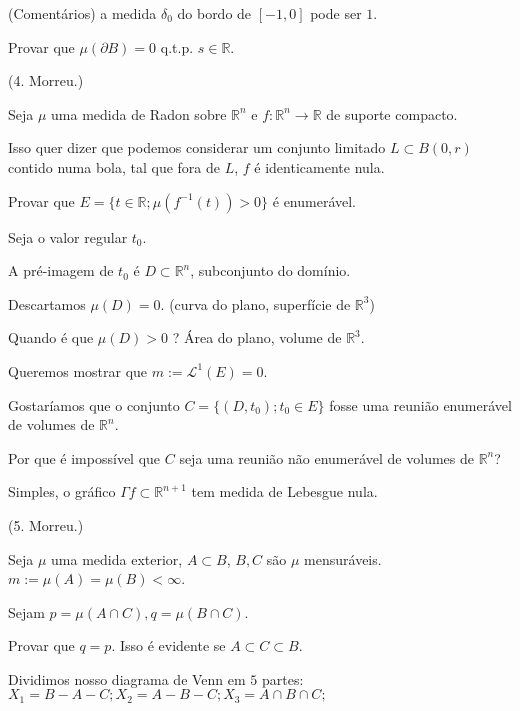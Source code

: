 \documentclass[12pt]{article}
\begin{document}
\vspace{3mm}

(Coment\'arios) a medida $\delta_0$ do bordo de $[-1, 0]$ pode ser $1$.

Provar que $\mu (\partial B) = 0$ q.t.p. $s \in \mathbb{R}$.

\vspace{3mm}

(4. Morreu.)

Seja $\mu$ uma medida de Radon sobre $\mathbb{R}^n$ e $f : \mathbb{R}^n \to \mathbb{R}$ de suporte compacto.

Isso quer dizer que podemos considerar um conjunto limitado $L \subset B(0, r)$ contido numa bola, tal que fora de $L$, $f$ \'e identicamente nula.

Provar que $E = \{ t \in \mathbb{R} ; \mu(f^{-1}(t)) > 0 \}$ \'e enumer\'avel.

Seja o valor regular $t_0$.

A pr\'e-imagem de $t_0$ \'e $D \subset \mathbb{R}^n$, subconjunto do dom\'inio.

Descartamos $\mu(D) = 0$. (curva do plano, superf\'icie de $\mathbb{R}^3$)

Quando \'e que $\mu(D) > 0$ ? \'Area do plano, volume de $\mathbb{R}^3$.

Queremos mostrar que $m := \mathcal{L}^1(E) = 0$.

Gostar\'iamos que o conjunto $C = \{ (D, t_0) ; t_0 \in E \}$ fosse uma reuni\~ao enumer\'avel de volumes de $\mathbb{R}^n$.

Por que \'e imposs\'ivel que $C$ seja uma reuni\~ao n\~ao enumer\'avel de volumes de $\mathbb{R}^n$?

Simples, o gr\'afico $\Gamma f \subset \mathbb{R}^{n + 1}$ tem medida de Lebesgue nula.

\vspace{3mm}

\vspace{3mm}

(5. Morreu.)

Seja $\mu$ uma medida exterior, $A \subset B$, $B, C$ s\~ao $\mu$ mensur\'aveis. $m := \mu(A) = \mu(B) < \infty$.

Sejam $p = \mu(A \cap C), q = \mu(B \cap C)$.

Provar que $q = p$. Isso \'e evidente se $A \subset C \subset B$.

Dividimos nosso diagrama de Venn em $5$ partes: $X_1 = B - A - C; X_2 = A - B - C ; X_3 = A \cap B \cap C ;$
\end{document}
